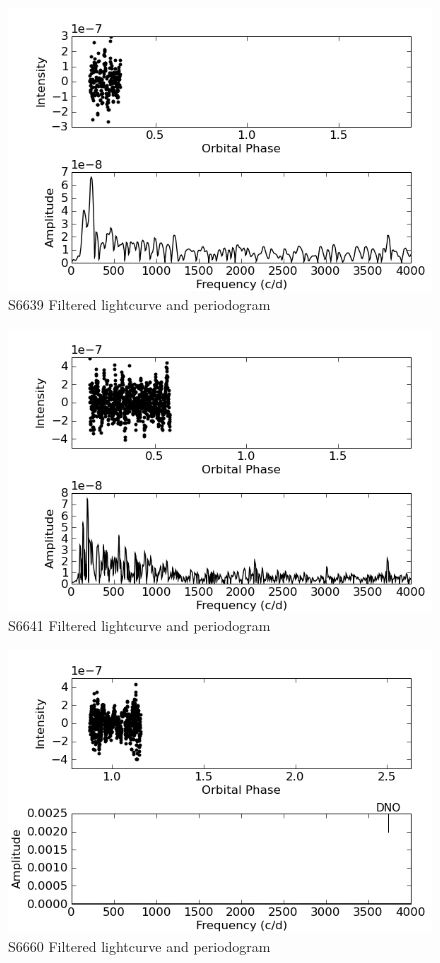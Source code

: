 \begin{figure}
 \centering
 \includegraphics[bb=0 0 600 400,width=0.85\columnwidth]{images/archive_phot/S6639/S6639d_FF.png}
 \caption{S6639 Filtered lightcurve and periodogram}
 \label{S6639_c_FF}
\end{figure}

\begin{figure}
 \centering
 \includegraphics[bb=0 0 600 400,width=0.85\columnwidth]{images/archive_phot/S6641/S6641d_FF.png}
 \caption{S6641 Filtered lightcurve and periodogram}
 \label{S6641_c_FF}
\end{figure}

\begin{figure}
 \centering
 \includegraphics[bb=0 0 600 400,width=0.85\columnwidth]{images/archive_phot/S6660/S6660d_FF.png}
 \caption{S6660 Filtered lightcurve and periodogram}
 \label{S6660_c_FF}
\end{figure}

